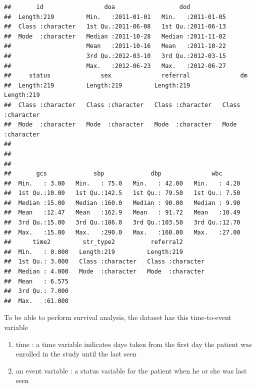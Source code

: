 \documentclass[
]{book}
\providecommand{\tightlist}{%
  \setlength{\itemsep}{0pt}\setlength{\parskip}{0pt}}
\begin{document}
\begin{verbatim}
##       id                 doa                  dod            
##  Length:219         Min.   :2011-01-01   Min.   :2011-01-05  
##  Class :character   1st Qu.:2011-06-08   1st Qu.:2011-06-13  
##  Mode  :character   Median :2011-10-28   Median :2011-11-02  
##                     Mean   :2011-10-16   Mean   :2011-10-22  
##                     3rd Qu.:2012-03-10   3rd Qu.:2012-03-15  
##                     Max.   :2012-06-23   Max.   :2012-06-27  
##     status              sex              referral              dm           
##  Length:219         Length:219         Length:219         Length:219        
##  Class :character   Class :character   Class :character   Class :character  
##  Mode  :character   Mode  :character   Mode  :character   Mode  :character  
##                                                                             
##                                                                             
##                                                                             
##       gcs             sbp             dbp              wbc       
##  Min.   : 3.00   Min.   : 75.0   Min.   : 42.00   Min.   : 4.20  
##  1st Qu.:10.00   1st Qu.:142.5   1st Qu.: 79.50   1st Qu.: 7.50  
##  Median :15.00   Median :160.0   Median : 90.00   Median : 9.90  
##  Mean   :12.47   Mean   :162.9   Mean   : 91.72   Mean   :10.49  
##  3rd Qu.:15.00   3rd Qu.:186.0   3rd Qu.:103.50   3rd Qu.:12.70  
##  Max.   :15.00   Max.   :290.0   Max.   :160.00   Max.   :27.00  
##      time2         str_type2          referral2        
##  Min.   : 0.000   Length:219         Length:219        
##  1st Qu.: 3.000   Class :character   Class :character  
##  Median : 4.000   Mode  :character   Mode  :character  
##  Mean   : 6.575                                        
##  3rd Qu.: 7.000                                        
##  Max.   :61.000
\end{verbatim}

To be able to perform survival analysis, the dataset has this time-to-event variable

\begin{enumerate}
\def\labelenumi{\arabic{enumi}.}
\tightlist
\item
  time : a time variable indicates days taken from the first day the patient was enrolled in the study until the last seen\\
\item
  an event variable : a status variable for the patient when he or she was last seen
\end{enumerate}
\end{document}
